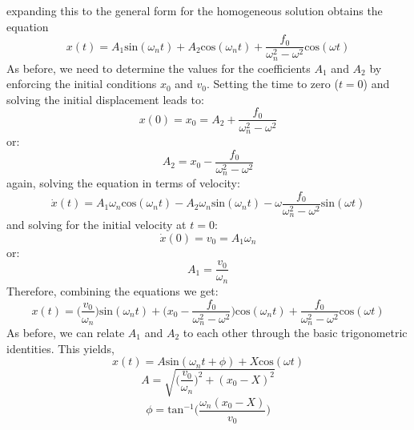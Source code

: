 \documentclass[12pt,letter]{article}
\numberwithin{ex}{section} %
\begin{document}
			expanding this to the general form for the homogeneous solution obtains the equation
			\begin{equation}
				x(t) = A_1\text{sin}(\omega_n t) + A_2\text{cos}(\omega_n t) + \frac{f_0}{\omega_n^2-\omega^2}\text{cos}(\omega t)
			\end{equation}				
			As before, we need to determine the values for the coefficients $A_1$ and $A_2$ by enforcing the initial conditions $x_0$ and $v_0$. Setting the time to zero ($t=0$) and solving the initial displacement leads to:
			\begin{equation}
				x(0) = x_0 = A_2 + \frac{f_0}{\omega_n^2-\omega^2}
			\end{equation}				
			or:
			\begin{equation}
				A_2 = x_0-\frac{f_0}{\omega_n^2-\omega^2}
			\end{equation}	
			again, solving the equation in terms of velocity:
			\begin{equation}
				\dot{x}(t) = A_1\omega_n\text{cos}(\omega_n t) - A_2 \omega_n \text{sin}(\omega_n t) - \omega \frac{f_0}{\omega_n^2-\omega^2}\text{sin}(\omega t)
			\end{equation}	
			and solving for the initial velocity at $t=0$:
			\begin{equation}
				\dot{x}(0) = v_0 =  A_1 \omega_n
			\end{equation}				
			or:
			\begin{equation}
				A_1 = \frac{v_0}{\omega_n}
			\end{equation}				
			Therefore, combining the equations we get:
			\begin{equation}
				x(t) = \Big(\frac{v_0}{\omega_n}\Big)\text{sin}(\omega_n t) + \Big(x_0-\frac{f_0}{\omega_n^2-\omega^2}\Big)\text{cos}(\omega_n t) + \frac{f_0}{\omega_n^2-\omega^2}\text{cos}(\omega t)
			\end{equation}	
			As before, we can relate $A_1$ and $A_2$ to each other through the basic trigonometric identities. This yields, 
			\begin{equation}
				x(t) = A\text{sin}(\omega_n t + \phi) + X\text{cos}(\omega t) 
			\end{equation}				
			\begin{equation}
				A = \sqrt{\bigg(\frac{v_0}{\omega_n}\bigg)^2+(x_0-X)^2}
			\end{equation}				
			\begin{equation}
				\phi = \text{tan}^{-1}\bigg(\frac{\omega_n(x_0-X)}{v_0}\bigg)
			\end{equation}				
\end{document}
